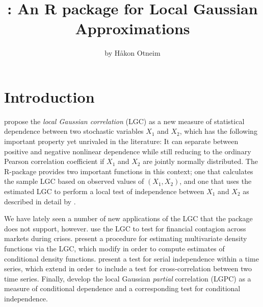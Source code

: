 \title{: An R package for Local Gaussian Approximations}
\author{by H{\aa}kon Otneim}

\maketitle


\section{Introduction}
\label{chap:introduction}

\citet{tjos:huft:2013} propose the \emph{local Gaussian correlation} (LGC) as a new measure of statistical dependence between two stochastic variables $X_1$ and $X_2$, which has the following important property yet unrivaled in the literature: It can separate between positive and negative nonlinear dependence while still reducing to the ordinary Pearson correlation coefficient if $X_1$ and $X_2$ are jointly normally distributed. The R-package  \citep{bere:klep:tjos:2014} provides two important functions in this context; one that calculates the sample LGC based on observed values of $\left(X_1,X_2\right)$, and one that uses the estimated LGC to perform a local test of independence between $X_1$ and $X_2$ as described in detail by \citet{bere:tjos:2014}.  

We have lately seen a number of new applications of the LGC that the  package does not support, however. \citet{stov:tjos:huft:2014} use the LGC to test for financial contagion across markets during crises. \citet{otne:tjos:2017} present a procedure for estimating multivariate density functions via the LGC, which \citet{otne:tjos:2018} modify in order to compute estimates of conditional density functions. \citet{laca:tjos:2017} present a test for serial independence within a time series, which \citet{laca:tjos:2018} extend in order to include a test for cross-correlation between two time series. Finally, \citet{otne:tjos:2019} develop the local Gaussian \emph{partial} correlation (LGPC) as a measure of conditional dependence and a corresponding test for conditional independence. 

